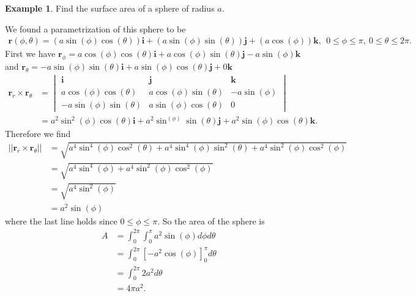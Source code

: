 \documentclass[12pt, letter]{article}
\theoremstyle{plain}
\numberwithin{theorem}{section}
\theoremstyle{definition}
\newtheorem{example}[theorem]{Example}
\begin{document}
\bigskip

\hrulefill

\bigskip

\begin{example}
Find the surface area of a sphere of radius $a$.

\bigskip

We found a parametrization of this sphere to be
\begin{align*}
\bm{r}(\phi,\theta) = (a\sin(\phi)\cos(\theta))\bm{i}+(a\sin(\phi)\sin(\theta))\bm{j}+(a\cos(\phi))\bm{k}, \ \ 0\leq \phi \leq \pi, \ 0\leq \theta \leq 2\pi.
\end{align*}
First we have $\bm{r}_\phi = a\cos(\phi)\cos(\theta)\bm{i}+a\cos(\phi)\sin(\theta)\bm{j}-a\sin(\phi)\bm{k}$ and $\bm{r}_\theta = -a\sin(\phi)\sin(\theta)\bm{i}+a\sin(\phi)\cos(\theta)\bm{j}+0\bm{k}$
\begin{align*}
\bm{r}_r \times \bm{r}_\theta &= \begin{vmatrix} \bm{i} & \bm{j} & \bm{k} \\ a\cos(\phi)\cos(\theta) & a\cos(\phi)\sin(\theta) & -a\sin(\phi) \\ -a\sin(\phi)\sin(\theta) & a\sin(\phi)\cos(\theta) & 0 \end{vmatrix}\\
&= a^2\sin^2(\phi)\cos(\theta)\bm{i}+a^2\sin^(\phi)\sin(\theta)\bm{j}+a^2\sin(\phi)\cos(\theta)\bm{k}.
\end{align*}
Therefore we find
\begin{align*}
||\bm{r}_r\times\bm{r}_\theta|| &= \sqrt{a^4\sin^4(\phi)\cos^2(\theta)+a^4\sin^4(\phi)\sin^2(\theta)+a^4\sin^2(\phi)\cos^2(\phi)}\\
&= \sqrt{a^4\sin^4(\phi)+a^4\sin^2(\phi)\cos^2(\phi)}\\
&=\sqrt{a^4\sin^2(\phi)}\\
&= a^2\sin(\phi)
\end{align*}
where the last line holds since $0\leq \phi \leq \pi$. So the area of the sphere is
\begin{align*}
A &= \int_0^{2\pi}\int_0^\pi a^2\sin(\phi)d\phi d\theta\\
&= \int_0^{2\pi} \left[-a^2\cos(\phi)\right]_0^\pi d\theta\\
&=\int_0^{2\pi}2a^2d\theta\\
&= 4\pi a^2.
\end{align*}
\end{example}

\newpage

\end{document}
